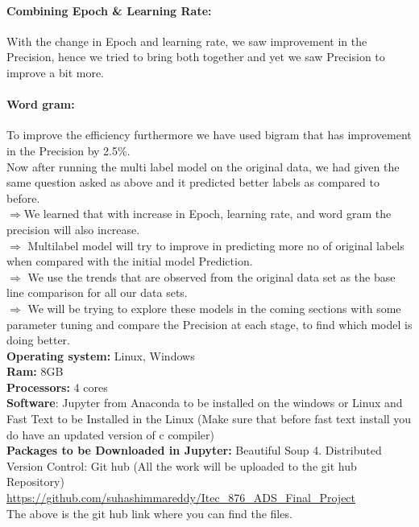 \documentclass[a4paper,1pt]{article}
\begin{document}
\paragraph{Combining Epoch \& Learning Rate:}{With the change in Epoch and learning rate, we saw improvement in the Precision, hence we tried to bring both together and yet we saw Precision to improve a bit more.}

\paragraph{Word gram:}{To improve the efficiency furthermore we have used bigram that has  improvement in the Precision by 2.5\%.}\\

\noindent Now after running the multi label model on the original data, we had given the same question asked as above and it predicted better labels as compared to before.\\

\noindent$\Rightarrow$We learned that with increase in Epoch, learning rate, and word gram the precision will also increase.\\

\noindent$\Rightarrow$ Multilabel model will try to improve in predicting more no of original labels when compared with the initial model Prediction.\\ 

\noindent$\Rightarrow$	We use the trends that are observed from the original data set as the base line comparison for all our data sets.\\

\noindent$\Rightarrow$	We will be trying to explore these models in the coming sections with some parameter tuning and compare the Precision at each stage, to find which model is doing better.\\


\noindent\textbf{Operating system:}  Linux, Windows\\
\textbf{Ram:} 8GB\\
\textbf{Processors:} 4 cores\\
\textbf{Software}: Jupyter from Anaconda to be installed on the windows or Linux and Fast Text to be Installed in the Linux (Make sure that before fast text install you do have an updated version of c compiler)\\

\noindent\textbf{Packages to be Downloaded in Jupyter:} Beautiful Soup 4.
Distributed Version Control: Git hub (All the work will be uploaded to the git hub Repository)\\
\url{https://github.com/suhashimmareddy/Itec_876_ADS_Final_Project}\\
The above is the git hub link where you can find the files. 
\end{document}
